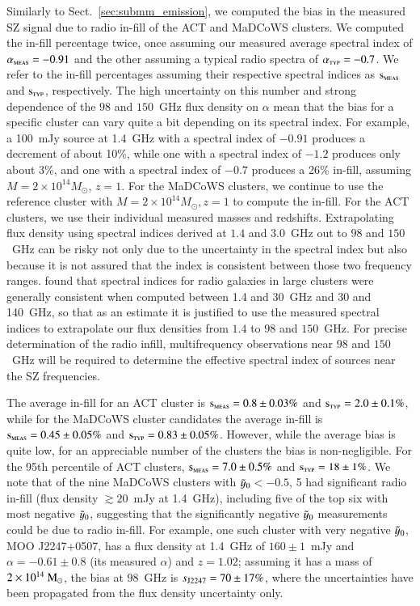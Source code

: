 \documentclass[longauth]{aa} %
\newcommand{\madcows}{MaDCoWS\xspace}
\newcommand{\yc}{$\Tilde{\vary}_0$\xspace}
\begin{document}
Similarly to Sect.~\ref{sec:submm_emission}, we computed the bias in the measured SZ signal due to radio in-fill of the ACT and \madcows clusters. We computed the in-fill percentage twice, once assuming our measured average spectral index of $\alpha_{\textsc{meas}} = -0.91$ and the other assuming a typical radio spectra of $\alpha_{\textsc{typ}} = -0.7$. We refer to the in-fill percentages assuming their respective spectral indices as $\textsc{s}_{\textsc{meas}}$ and $\textsc{s}_{\textsc{typ}}$, respectively. The high uncertainty on this number and strong dependence of the $98$ and $150$~GHz flux density on $\alpha$ mean that the bias for a specific cluster can vary quite a bit depending on its spectral index. For example, a 100~mJy source at 1.4~GHz with a spectral index of $-0.91$ produces a decrement of about 10\%, while one with a spectral index of $-1.2$ produces only about 3\%, and one with a spectral index of $-0.7$ produces a 26\% in-fill, assuming $M = 2\times 10^{14} M_{\odot}$, $z = 1$. For the \madcows clusters, we continue to use the reference cluster with $M = 2\times 10^{14} M_{\odot}, z = 1$ to compute the in-fill. For the ACT clusters, we use their individual measured masses and redshifts. 
Extrapolating flux density using spectral indices derived at $1.4$ and $3.0$~GHz out to $98$ and $150$~GHz can be risky not only due to the uncertainty in the spectral index but also because it is not assured that the index is consistent between those two frequency ranges. \citet{Sayers2013} found that spectral indices for radio galaxies in large clusters were generally consistent when computed between 1.4 and 30~GHz and 30 and 140~GHz, so that as an estimate it is justified to use the measured spectral indices to extrapolate our flux densities from $1.4$ to $98$ and $150$~GHz. For precise determination of the radio infill, multifrequency observations near $98$ and $150$~GHz will be required to determine the effective spectral index of sources near the SZ frequencies.

The average in-fill for an ACT cluster is $\textsc{s}_{\textsc{meas}} = 0.8\pm 0.03\%$ and $\textsc{s}_{\textsc{typ}}= 2.0\pm0.1\%$, while for the \madcows cluster candidates the average in-fill is $\textsc{s}_{\textsc{meas}} =0.45 \pm 0.05 \%$ and $\textsc{s}_{\textsc{typ}}= 0.83\pm0.05\%$. However, while the average bias is quite low, for an appreciable number of the clusters the bias is non-negligible. For the 95th percentile of ACT clusters, $\textsc{s}_{\textsc{meas}} = 7.0\pm 0.5\%$ and $\textsc{s}_{\textsc{typ}}= 18\pm1\%$. We note that of the nine \madcows clusters with \yc $< -0.5$, 5 had significant radio in-fill (flux density $\gtrsim 20$~mJy at 1.4~GHz), including five of the top six with most negative \yc, suggesting that the significantly negative \yc measurements could be due to radio in-fill. For example, one such cluster with very negative \yc, MOO J2247+0507, has a flux density at 1.4~GHz of $160\pm 1$~mJy and $\alpha = -0.61\pm 0.8$ (its measured $\alpha$) and $z = 1.02$; assuming it has a mass of $2\times 10^{14}~\rm M_{\odot}$, the bias at 98~GHz is $s_{\textsc{J2247}} = 70\pm 17\%$, where the uncertainties have been propagated from the flux density uncertainty only. 
\end{document}
